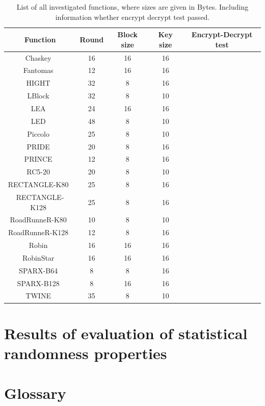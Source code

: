 \documentclass[
    digital,    %
    oneside,    %
    color,
    11pt,
    nocover,
    notable,
    nolof,
    nolot,
    final
]{fithesis3}
\renewcommand\_{\textunderscore\allowbreak}
\newcommand{\cmark}{\ding{51}}%
\newcommand{\xmark}{\ding{55}}%
\begin{document}
\begin{table}[t]
	\centering
	\begin{tabular}{c|c c c c}
		\textbf{\large Function} & \textbf{\large Round} & \textbf{\large Block size} & \textbf{\large Key size} & \textbf{\large Encrypt-Decrypt test}\\ \hline
		Chaskey~\cite{cryptoeprint:2014:386}				& 16	& 16	& 16	& \cmark	\\ \hline
		Fantomas~\cite{grosso2014ls}						& 12	& 16	& 16	& \cmark 	\\ \hline
		HIGHT~\cite{10.1007/11894063_4}						& 32	& 8		& 16	& \xmark 	\\ \hline
		LBlock~\cite{10.1007/978-3-642-21554-4_19}			& 32	& 8		& 10	& \xmark \\ \hline
		LEA~\cite{Hong2013LEAA1}							& 24	& 16	& 16	& \xmark \\ \hline
		LED~\cite{Guo:2011:LBC:2044928.2044958}				& 48	& 8		& 10	& \cmark \\ \hline
		Piccolo~\cite{10.1007/978-3-642-23951-9_23}			& 25	& 8		& 10	& \cmark \\ \hline
		PRIDE~\cite{10.1007/978-3-662-44371-2_4}			& 20	& 8		& 16	& \xmark  \\ \hline
		PRINCE~\cite{10.1007/978-3-642-34961-4_14}			& 12	& 8		& 16	& \cmark \\ \hline
		RC5-20~\cite{10.1007/3-540-60590-8_7}				& 20	& 8		& 10	& \cmark \\ \hline
		RECTANGLE-K80~\cite{Zhang2015}						& 25	& 8		& 16	& \xmark \\ \hline
		RECTANGLE-K128~\cite{Zhang2015}						& 25	& 8		& 16	& \xmark \\ \hline
		RoadRunneR-K80~\cite{10.1007/978-3-319-29078-2_4}	& 10	& 8		& 10	& \cmark \\ \hline
		RoadRunneR-K128~\cite{10.1007/978-3-319-29078-2_4}	& 12	& 8		& 16	& \cmark \\ \hline
		Robin~\cite{grosso2014ls}							& 16	& 16	& 16	& \cmark \\ \hline
		RobinStar~\cite{grosso2014ls}						& 16	& 16	& 16	& \cmark \\ \hline
		SPARX-B64~\cite{10.1007/978-3-662-53887-6_18}		& 8		& 8		& 16	& \cmark \\ \hline
		SPARX-B128~\cite{10.1007/978-3-662-53887-6_18}		& 8		& 16	& 16	& \cmark \\ \hline
		TWINE~\cite{twine}									& 35	& 8		& 10	& \cmark \\ \hline
		
		
	\end{tabular}
	\caption{List of all investigated functions, where sizes are given in Bytes. Including information whether encrypt decrypt test passed.}
	\label{table:list-of-investigated functions}
\end{table}



\chapter{Results of evaluation of statistical randomness properties}



\printbibliography[heading=bibintoc] %

\appendix{}

\chapter{Glossary}
\label{chap:app-glos}
\end{document}
